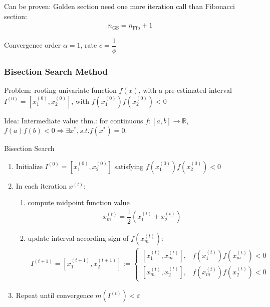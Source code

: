    Can be proven: Golden section need one more iteration call than Fibonacci section:
    \begin{align}
        n_\mathrm{GS}=n_\mathrm{Fib}+1 
    \end{align}

    Convergence order $ \alpha =1 $, rate $ c=\dfrac{1}{\phi } $


 
\subsubsection{Bisection Search Method}
    \hypertarget{Bisection}{Problem}: rooting univariate function $ f(x) $, with a pre-­estimated interval $ I^{(0)}=[x_1^{(0)},x_2^{(0)}] $, with $ f(x_1^{(0)})f(x_2^{(0)})<0 $

    Idea: Intermediate value thm.: for continuous $ f:[a,b]\to \mathbb{R}  $, $ f(a)f(b)<0\Rightarrow \exists x^*, s.t. f(x^*)=0 $. 

\begin{algorithm}{Bisection Search}
    
\begin{enumerate}[topsep=2pt,itemsep=2pt]
    \item Initialize $ I^{(0)}=[x_1^{(0)},x_2^{(0)}] $ satisfying $ f(x_1^{(0)})f(x_2^{(0)})<0 $
    \item In each iteration $ x^{(t)} $:
    \begin{enumerate}[topsep=2pt,itemsep=2pt]
        \item compute midpoint function value
    \begin{align}
        x_m^{(t)}=\dfrac{1}{2}\left(x_1^{(t)}+x_2^{(t)}\right) 
    \end{align}
        \item update interval according sign of $ f(x_m^{(t)}) $:
    \begin{align}
        I^{(t+1)}=[x_1^{(t+1)},x_2^{(t+1)}]:=\begin{cases}
            [x_1^{(t)},x_m^{(t)}],& f(x_1^{(t)})f(x_m^{(t)})<0\\
            [x_m^{(t)},x_2^{(t)}],& f(x_m^{(t)})f(x_2^{(t)})<0
        \end{cases} 
    \end{align}
    \end{enumerate}

    \item Repeat until convergence $ m(I^{(t)})<\varepsilon  $
\end{enumerate}
\end{algorithm}
    



